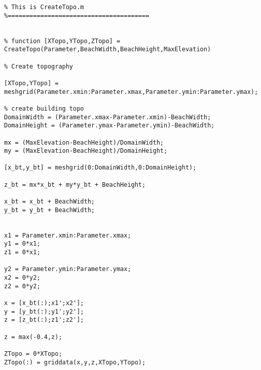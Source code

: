 \lstset{basicstyle=\footnotesize\ttfamily}
    
\begin{lstlisting}[breaklines]
%=======================================
% This is CreateTopo.m
%=======================================


% function [XTopo,YTopo,ZTopo] = CreateTopo(Parameter,BeachWidth,BeachHeight,MaxElevation)

% Create topography

[XTopo,YTopo] = meshgrid(Parameter.xmin:Parameter.xmax,Parameter.ymin:Parameter.ymax);

% create building topo
DomainWidth = (Parameter.xmax-Parameter.xmin)-BeachWidth;
DomainHeight = (Parameter.ymax-Parameter.ymin)-BeachWidth;

mx = (MaxElevation-BeachHeight)/DomainWidth;
my = (MaxElevation-BeachHeight)/DomainHeight;

[x_bt,y_bt] = meshgrid(0:DomainWidth,0:DomainHeight);

z_bt = mx*x_bt + my*y_bt + BeachHeight;

x_bt = x_bt + BeachWidth;
y_bt = y_bt + BeachWidth;


x1 = Parameter.xmin:Parameter.xmax;
y1 = 0*x1;
z1 = 0*x1;

y2 = Parameter.ymin:Parameter.ymax;
x2 = 0*y2;
z2 = 0*y2;

x = [x_bt(:);x1';x2'];
y = [y_bt(:);y1';y2'];
z = [z_bt(:);z1';z2'];

z = max(-0.4,z);

ZTopo = 0*XTopo;
ZTopo(:) = griddata(x,y,z,XTopo,YTopo);
    
\end{lstlisting}
